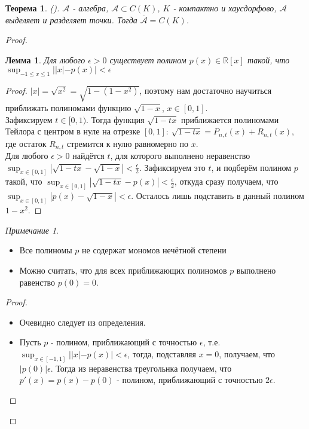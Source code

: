 \documentclass[a4paper]{article}
\theoremstyle{indented}
\newtheorem{theorem}{Теорема}
\newtheorem{lemma}{Лемма}
\theoremstyle{definition}
\theoremstyle{remark}
\newtheorem{remark}{Примечание}
\begin{document}
\begin{theorem} ().
    $\mathcal{A}$ - алгебра, $\mathcal{A} \subset C(K)$, $K$ - компактно и хаусдорфово,
    $\mathcal{A}$ выделяет и разделяет точки. Тогда $\overline{\mathcal{A}}=C(K)$.
\end{theorem}
\begin{proof} \ 
    \begin{lemma}
    Для любого $\epsilon > 0$ существует полином $p(x) \in \mathbb{R}[x]$ такой, что $\sup_{-1 \leq x \leq 1} ||x|-p(x)| < \epsilon$ 
    \end{lemma}
    \begin{proof}
        $|x|=\sqrt{x^2}=\sqrt{1-(1-x^2)}$, поэтому нам достаточно научиться приближать полиномами функцию $\sqrt{1-x}$, $x \in [0, 1]$.
        \\
        Зафиксируем $t \in [0, 1)$. Тогда функция $\sqrt{1-tx}$ приближается полиномами Тейлора с центром в нуле на отрезке $[0, 1]$: $\sqrt{1-tx}=P_{n, t}(x)+R_{n, t}(x)$, где остаток $R_{n, t}$ стремится к нулю равномерно по $x$. 
        \\
        Для любого $\epsilon > 0$ найдётся $t$, для которого выполнено неравенство $\sup_{x \in [0, 1]} |\sqrt{1-tx}-\sqrt{1-x}| < \frac{\epsilon}{2}$. Зафиксируем это $t$, и подберём полином $p$ такой, что $\sup_{x \in [0, 1]}|\sqrt{1-tx}-p(x)|< \frac{\epsilon}{2}$, откуда сразу получаем, что $\sup_{x \in [0, 1]} |p(x)-\sqrt{1-x}|<\epsilon$. Осталось лишь подставить в данный полином $1-x^2$.
    \end{proof}
    \begin{remark}
        \begin{itemize}
            \item Все полиномы $p$ не содержат мономов нечётной степени
            \item Можно считать, что для всех приближающих полиномов $p$ выполнено равенство $p(0)=0$.
        \end{itemize}
    \end{remark}
    \begin{proof}
       \begin{itemize}
            \item Очевидно следует из определения.
            \item Пусть $p$ - полином, приближающий с точностью $\epsilon$, т.е. $\sup_{x \in [-1, 1]} ||x|-p(x)| < \epsilon$, тогда, подставляя $x=0$, получаем, что $|p(0)| \epsilon$. Тогда из неравенства треугольнка получаем, что $p'(x)=p(x)-p(0)$ - полином, приближающий с точностью $2\epsilon$.
        \end{itemize} 
    \end{proof}
\end{proof}
\end{document}
